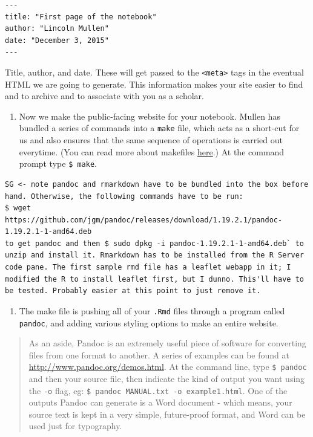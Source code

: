 \documentclass[english,]{book}
\providecommand{\tightlist}{%
  \setlength{\itemsep}{0pt}\setlength{\parskip}{0pt}}
\begin{document}
\begin{verbatim}
---
title: "First page of the notebook"
author: "Lincoln Mullen"
date: "December 3, 2015"
---
\end{verbatim}

Title, author, and date. These will get passed to the
\texttt{\textless{}meta\textgreater{}} tags in the eventual HTML we are
going to generate. This information makes your site easier to find and
to archive and to associate with you as a scholar.

\begin{enumerate}
\def\labelenumi{\alph{enumi}.}
\setcounter{enumi}{6}
\tightlist
\item
  Now we make the public-facing website for your notebook. Mullen has
  bundled a series of commands into a \texttt{make} file, which acts as
  a short-cut for us and also ensures that the same sequence of
  operations is carried out everytime. (You can read more about
  makefiles \href{https://bost.ocks.org/mike/make/}{here}.) At the
  command prompt type \texttt{\$\ make}.
\end{enumerate}

\begin{verbatim}
SG <- note pandoc and rmarkdown have to be bundled into the box before hand. Otherwise, the following commands have to be run:
$ wget https://github.com/jgm/pandoc/releases/download/1.19.2.1/pandoc-1.19.2.1-1-amd64.deb
to get pandoc and then $ sudo dpkg -i pandoc-1.19.2.1-1-amd64.deb` to unzip and install it. Rmarkdown has to be installed from the R Server code pane. The first sample rmd file has a leaflet webapp in it; I modified the R to install leaflet first, but I dunno. This'll have to be tested. Probably easier at this point to just remove it.
\end{verbatim}

\begin{enumerate}
\def\labelenumi{\alph{enumi}.}
\setcounter{enumi}{7}
\tightlist
\item
  The make file is pushing all of your \texttt{.Rmd} files through a
  program called \texttt{pandoc}, and adding various styling options to
  make an entire website.
\end{enumerate}

\begin{quote}
As an aside, Pandoc is an extremely useful piece of software for
converting files from one format to another. A series of examples can be
found at \url{http://www.pandoc.org/demos.html}. At the command line,
type \texttt{\$\ pandoc} and then your source file, then indicate the
kind of output you want using the \texttt{-o} flag, eg:
\texttt{\$\ pandoc\ MANUAL.txt\ -o\ example1.html}. One of the outputs
Pandoc can generate is a Word document - which means, your source text
is kept in a very simple, future-proof format, and Word can be used just
for typography.
\end{quote}
\end{document}
